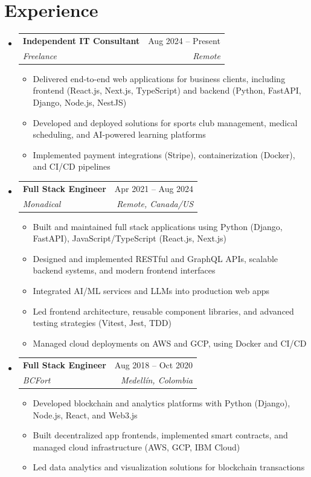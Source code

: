 \documentclass[letterpaper,11pt]{article}
\makeatletter
\newcommand{\resumeSubheading}[4]{
  \vspace{-2pt}
  \item[]
  \begin{tabular*}{\textwidth}{@{\extracolsep{\fill}}l r}
    \textbf{#1} & #2 \\
    \textit{#3} & \textit{#4} \\
  \end{tabular*}
  \vspace{-5pt}
}
\makeatother
\begin{document}
\section{Experience}
\begin{itemize}[leftmargin=0pt, itemindent=0pt, label={}, itemsep=1pt]
\resumeSubheading
{Independent IT Consultant}{Aug 2024 -- Present}
{Freelance}{Remote}
\begin{itemize}[leftmargin=*, itemsep=0pt]
    \item Delivered end-to-end web applications for business clients, including frontend (React.js, Next.js, TypeScript) and backend (Python, FastAPI, Django, Node.js, NestJS)
    \item Developed and deployed solutions for sports club management, medical scheduling, and AI-powered learning platforms
    \item Implemented payment integrations (Stripe), containerization (Docker), and CI/CD pipelines
\end{itemize}

\resumeSubheading
{Full Stack Engineer}{Apr 2021 -- Aug 2024}
{Monadical}{Remote, Canada/US}
\begin{itemize}[leftmargin=*, itemsep=0pt]
    \item Built and maintained full stack applications using Python (Django, FastAPI), JavaScript/TypeScript (React.js, Next.js)
    \item Designed and implemented RESTful and GraphQL APIs, scalable backend systems, and modern frontend interfaces
    \item Integrated AI/ML services and LLMs into production web apps
    \item Led frontend architecture, reusable component libraries, and advanced testing strategies (Vitest, Jest, TDD)
    \item Managed cloud deployments on AWS and GCP, using Docker and CI/CD
\end{itemize}

\resumeSubheading
{Full Stack Engineer}{Aug 2018 -- Oct 2020}
{BCFort}{Medellín, Colombia}
\begin{itemize}[leftmargin=*, itemsep=0pt]
    \item Developed blockchain and analytics platforms with Python (Django), Node.js, React, and Web3.js
    \item Built decentralized app frontends, implemented smart contracts, and managed cloud infrastructure (AWS, GCP, IBM Cloud)
    \item Led data analytics and visualization solutions for blockchain transactions
\end{itemize}


\end{itemize}
\end{document}
